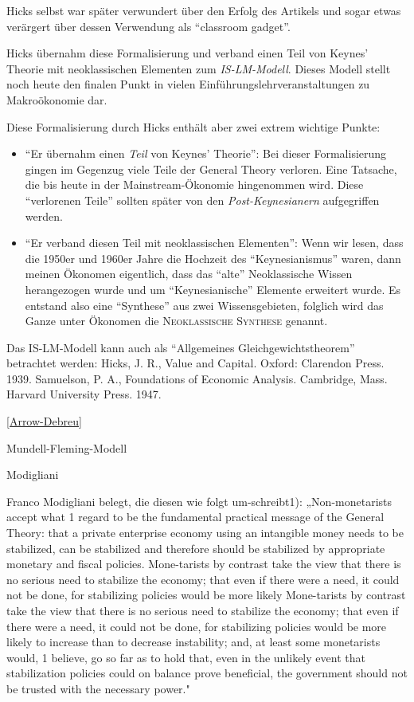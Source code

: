 Hicks selbst war später verwundert über den Erfolg des Artikels und sogar etwas verärgert über dessen Verwendung als "`classroom gadget"'. 


Hicks  übernahm diese Formalisierung und verband einen Teil von Keynes' Theorie mit neoklassischen Elementen zum \textit{IS-LM-Modell}. Dieses Modell stellt noch heute den finalen Punkt in vielen Einführungslehrveranstaltungen zu Makroökonomie dar.

Diese Formalisierung durch Hicks enthält aber zwei extrem wichtige Punkte:
\begin{itemize}
	\item "`Er übernahm einen \textit{Teil} von Keynes' Theorie"': Bei dieser Formalisierung gingen im Gegenzug viele Teile der General Theory verloren. Eine Tatsache, die bis heute in der Mainstream-Ökonomie hingenommen wird. Diese "`verlorenen Teile"' sollten später von den \textit{Post-Keynesianern} aufgegriffen werden.
	\item "`Er verband diesen Teil mit neoklassischen Elementen"': Wenn wir lesen, dass die 1950er und 1960er Jahre die Hochzeit des "`Keynesianismus"' waren, dann meinen Ökonomen eigentlich, dass das "`alte"' Neoklassische Wissen herangezogen wurde und um "`Keynesianische"' Elemente erweitert wurde. Es entstand also eine "`Synthese"' aus zwei Wissensgebieten, folglich wird das Ganze unter Ökonomen die \textsc{Neoklassische Synthese} genannt.
\end{itemize}






Das IS-LM-Modell kann auch als "`Allgemeines Gleichgewichtstheorem"' betrachtet werden:
Hicks, J. R., Value and Capital. Oxford: Clarendon Press. 1939.
Samuelson, P. A., Foundations of Economic Analysis. Cambridge, Mass. Harvard University Press. 1947.

\ref{Arrow-Debreu}




Mundell-Fleming-Modell


Modigliani

Franco Modigliani belegt, die diesen wie folgt um-schreibt1): „Non-monetarists accept what 1 regard to be the fundamental practical message of the General Theory: that a private enterprise economy using an intangible money needs to be stabilized, can be stabilized and therefore should be stabilized by appropriate monetary and fiscal policies. Mone-tarists by contrast take the view that there is no serious need to stabilize the economy; that even if there were a need, it could not be done, for stabilizing policies would be more likely
Mone-tarists by contrast take the view that there is no serious need to stabilize the economy; that even if there were a need, it could not be done, for stabilizing policies would be more likely to increase than to decrease instability; and, at least some monetarists would, 1 believe, go so far as to hold that, even in the unlikely event that stabilization policies could on balance prove beneficial, the government should not be trusted with the necessary power."

